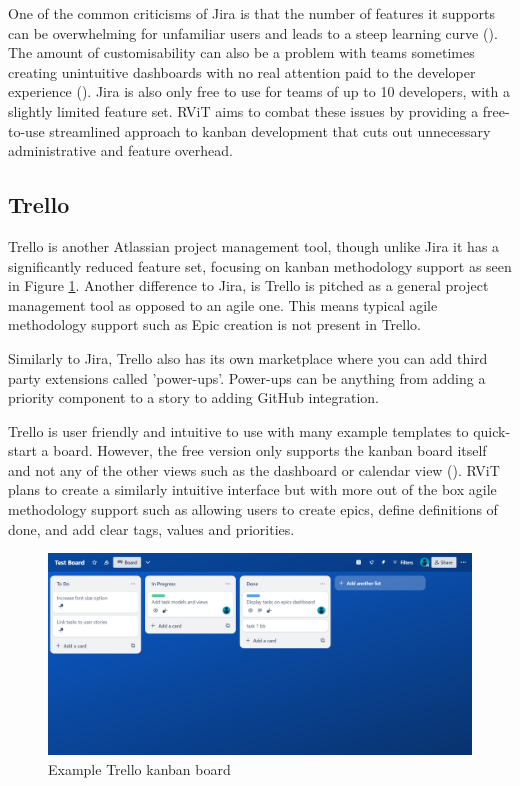 \documentclass[l4proj.tex]{subfiles}
\begin{document}
One of the common criticisms of Jira is that the number of features it supports can be overwhelming for unfamiliar users and leads to a steep learning curve (\cite{JiraProblemsFeatures}). The amount of customisability can also be a problem with teams sometimes creating unintuitive dashboards with no real attention paid to the developer experience (\cite{JiraProblemsFlexible}). Jira is also only free to use for teams of up to 10 developers, with a slightly limited feature set. RViT aims to combat these issues by providing a free-to-use streamlined approach to kanban development that cuts out unnecessary administrative and feature overhead.


\subsection{Trello}
Trello is another Atlassian project management tool, though unlike Jira it has a significantly reduced feature set, focusing on kanban methodology support as seen in Figure \ref{fig:Trello kanban}. Another difference to Jira, is Trello is pitched as a general project management tool as opposed to an agile one. This means typical agile methodology support such as Epic creation is not present in Trello.

Similarly to Jira, Trello also has its own marketplace where you can add third party extensions called 'power-ups'. Power-ups can be anything from adding a priority component to a story to adding GitHub integration.

Trello is user friendly and intuitive to use with many example templates to quick-start a board. However, the free version only supports the kanban board itself and not any of the other views such as the dashboard or calendar view (\cite{TrelloPricing}). RViT plans to create a similarly intuitive interface but with more out of the box agile methodology support such as allowing users to create epics, define definitions of done, and add clear tags, values and priorities.


\begin{figure}[h!]
\begin{center}
\includegraphics[scale=0.32]{dissertation/images/TrelloKanbanBoard.png}
\caption{Example Trello kanban board}
\label{fig:Trello kanban} 
\end{center}
\end{figure}
\end{document}
